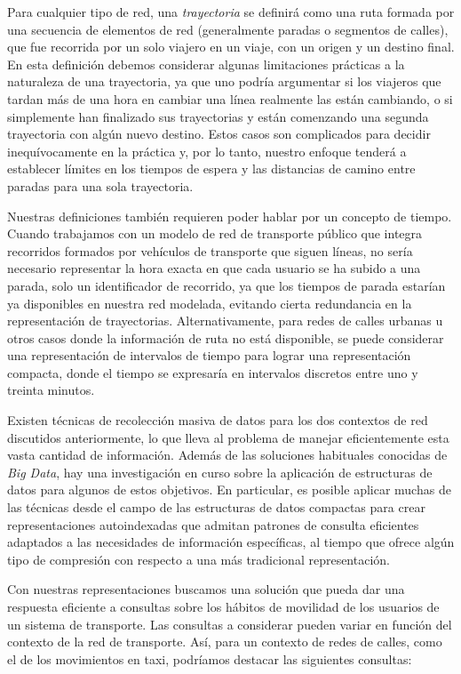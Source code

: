     Para cualquier tipo de red, una \textit{trayectoria} se definir\'a como una ruta formada por una secuencia de elementos de red (generalmente paradas o segmentos de calles), que fue recorrida por un solo viajero en un viaje, con un origen y un destino final. En esta definici\'on debemos considerar algunas limitaciones pr\'acticas a la naturaleza de una trayectoria, ya que uno podr\'ia argumentar si los viajeros que tardan m\'as de una hora en cambiar una l\'inea realmente las est\'an cambiando, o si simplemente han finalizado sus trayectorias y est\'an comenzando una segunda trayectoria con alg\'un nuevo destino. Estos casos son complicados para decidir inequ\'ivocamente en la pr\'actica y, por lo tanto, nuestro enfoque tender\'a a establecer l\'imites en los tiempos de espera y las distancias de camino entre paradas para una sola trayectoria.
    
    Nuestras definiciones tambi\'en requieren poder hablar por un concepto de tiempo. Cuando trabajamos con un modelo de red de transporte p\'ublico que integra recorridos formados por veh\'iculos de transporte que siguen l\'ineas, no ser\'ia necesario representar la hora exacta en que cada usuario se ha subido a una parada, solo un identificador de recorrido, ya que los tiempos de parada estar\'ian ya disponibles en nuestra red modelada, evitando cierta redundancia en la representaci\'on de trayectorias.
    Alternativamente, para redes de calles urbanas u otros casos donde la informaci\'on de ruta no est\'a disponible, se puede considerar una representaci\'on de intervalos de tiempo para lograr una representaci\'on compacta, donde el tiempo se expresar\'ia en intervalos discretos entre uno y treinta minutos.
    
    Existen t\'ecnicas de recolecci\'on masiva de datos para los dos contextos de red discutidos anteriormente, lo que lleva al problema de manejar eficientemente esta vasta cantidad de informaci\'on. Adem\'as de las soluciones habituales conocidas de \textit{Big Data}, hay una investigaci\'on en curso sobre la aplicaci\'on de estructuras de datos para algunos de estos objetivos. En particular, es posible aplicar muchas de las t\'ecnicas desde el campo de las estructuras de datos compactas para crear representaciones autoindexadas que admitan patrones de consulta eficientes adaptados a las necesidades de informaci\'on espec\'ificas, al tiempo que ofrece alg\'un tipo de compresi\'on con respecto a una m\'as tradicional representaci\'on.
    
    Con nuestras representaciones buscamos una soluci\'on que pueda dar una respuesta eficiente a consultas sobre los h\'abitos de movilidad de los usuarios de un sistema de transporte. Las consultas a considerar pueden variar en funci\'on del contexto de la red de transporte. As\'i, para un contexto de redes de calles, como el de los movimientos en taxi, podr\'iamos destacar las siguientes consultas:
    
